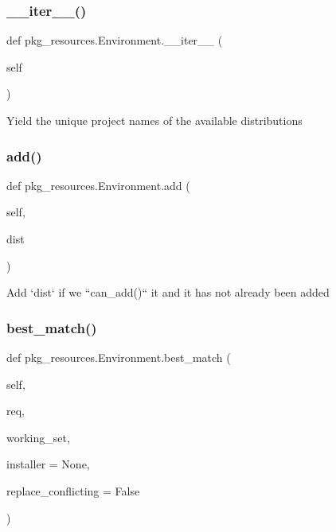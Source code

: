 \subsubsection{\texorpdfstring{\+\_\+\+\_\+iter\+\_\+\+\_\+()}{\_\_iter\_\_()}}
{\footnotesize\ttfamily def pkg\+\_\+resources.\+Environment.\+\_\+\+\_\+iter\+\_\+\+\_\+ (\begin{DoxyParamCaption}\item[{}]{self }\end{DoxyParamCaption})}

\begin{DoxyVerb}Yield the unique project names of the available distributions\end{DoxyVerb}
 \mbox{\label{classpkg__resources_1_1_environment_a0ba8999abdb4cbc7a1965766560197fc}} 
\subsubsection{\texorpdfstring{add()}{add()}}
{\footnotesize\ttfamily def pkg\+\_\+resources.\+Environment.\+add (\begin{DoxyParamCaption}\item[{}]{self,  }\item[{}]{dist }\end{DoxyParamCaption})}

\begin{DoxyVerb}Add `dist` if we ``can_add()`` it and it has not already been added
\end{DoxyVerb}
 \mbox{\label{classpkg__resources_1_1_environment_a7738575eddd2a89e35eff52f3462f20b}} 
\subsubsection{\texorpdfstring{best\+\_\+match()}{best\_match()}}
{\footnotesize\ttfamily def pkg\+\_\+resources.\+Environment.\+best\+\_\+match (\begin{DoxyParamCaption}\item[{}]{self,  }\item[{}]{req,  }\item[{}]{working\+\_\+set,  }\item[{}]{installer = {\ttfamily None},  }\item[{}]{replace\+\_\+conflicting = {\ttfamily False} }\end{DoxyParamCaption})}

